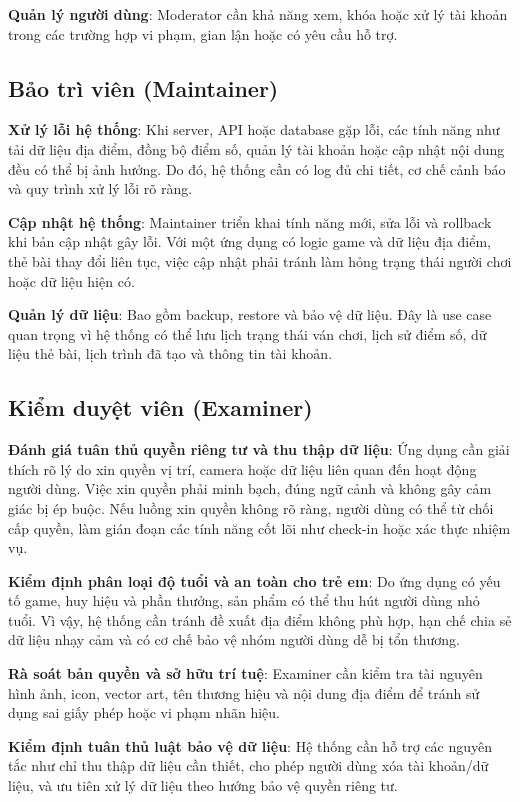 \textbf{Quản lý người dùng}: Moderator cần khả năng xem, khóa hoặc xử lý tài khoản trong các trường hợp vi phạm, gian lận hoặc có yêu cầu hỗ trợ.

\subsection{Bảo trì viên (Maintainer)}

\textbf{Xử lý lỗi hệ thống}: Khi server, API hoặc database gặp lỗi, các tính năng như tải dữ liệu địa điểm, đồng bộ điểm số, quản lý tài khoản hoặc cập nhật nội dung đều có thể bị ảnh hưởng. Do đó, hệ thống cần có log đủ chi tiết, cơ chế cảnh báo và quy trình xử lý lỗi rõ ràng.

\textbf{Cập nhật hệ thống}: Maintainer triển khai tính năng mới, sửa lỗi và rollback khi bản cập nhật gây lỗi. Với một ứng dụng có logic game và dữ liệu địa điểm, thẻ bài thay đổi liên tục, việc cập nhật phải tránh làm hỏng trạng thái người chơi hoặc dữ liệu hiện có.

\textbf{Quản lý dữ liệu}: Bao gồm backup, restore và bảo vệ dữ liệu. Đây là use case quan trọng vì hệ thống có thể lưu lịch trạng thái ván chơi, lịch sử điểm số, dữ liệu thẻ bài, lịch trình đã tạo và thông tin tài khoản.

\subsection{Kiểm duyệt viên (Examiner)}

\textbf{Đánh giá tuân thủ quyền riêng tư và thu thập dữ liệu}: Ứng dụng cần giải thích rõ lý do xin quyền vị trí, camera hoặc dữ liệu liên quan đến hoạt động người dùng. Việc xin quyền phải minh bạch, đúng ngữ cảnh và không gây cảm giác bị ép buộc. Nếu luồng xin quyền không rõ ràng, người dùng có thể từ chối cấp quyền, làm gián đoạn các tính năng cốt lõi như check-in hoặc xác thực nhiệm vụ.

\textbf{Kiểm định phân loại độ tuổi và an toàn cho trẻ em}: Do ứng dụng có yếu tố game, huy hiệu và phần thưởng, sản phẩm có thể thu hút người dùng nhỏ tuổi. Vì vậy, hệ thống cần tránh đề xuất địa điểm không phù hợp, hạn chế chia sẻ dữ liệu nhạy cảm và có cơ chế bảo vệ nhóm người dùng dễ bị tổn thương.

\textbf{Rà soát bản quyền và sở hữu trí tuệ}: Examiner cần kiểm tra tài nguyên hình ảnh, icon, vector art, tên thương hiệu và nội dung địa điểm để tránh sử dụng sai giấy phép hoặc vi phạm nhãn hiệu.

\textbf{Kiểm định tuân thủ luật bảo vệ dữ liệu}: Hệ thống cần hỗ trợ các nguyên tắc như chỉ thu thập dữ liệu cần thiết, cho phép người dùng xóa tài khoản/dữ liệu, và ưu tiên xử lý dữ liệu theo hướng bảo vệ quyền riêng tư.

